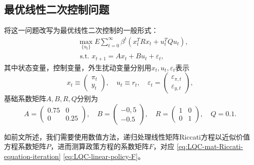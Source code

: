 \subsection{最优线性二次控制问题}
将这一问题改写为最优线性二次控制的一般形式：
\begin{align*}
  \label{eq:LQC-example-LQ-form}
  &\max_{\{u_t\}} E \sum_{t=0}^{\infty} \beta^t \left(x_t^T R x_t + u_t^T Q u_t\right), \\
  &\text{ s.t. } x_{t+1} = A x_t + B u_t + \varepsilon_t,
\end{align*}
其中状态变量，控制变量，外生扰动变量分别用$x_t,u_t,\varepsilon_t$表示
\begin{equation*}
  x_t \equiv \begin{pmatrix}
    \pi_t \\
    y_t
  \end{pmatrix},\quad
  u_t \equiv r_t,\quad
  \varepsilon_t = \begin{pmatrix}
  \varepsilon_{\pi,t} \\
  \varepsilon_{y,t}
  \end{pmatrix},
\end{equation*}
基础系数矩阵$A,B,R,Q$分别为
\begin{equation*}
  A=\begin{pmatrix}
  0.75 & 0 \\
  0 & 0.25
  \end{pmatrix}, \quad
  B = \begin{pmatrix}
  -0,5 \\ -0.5
  \end{pmatrix}, \quad
  R = \begin{pmatrix}
  1 & 0 \\
  0 & 1
  \end{pmatrix}, \quad
  Q=0.1.
\end{equation*}

如前文所述，我们需要使用数值方法，递归处理线性矩阵Riccati方程以近似价值方程系数矩阵$P$，进而测算政策方程的系数矩阵$F$，对应  \eqref{eq:LQC-mat-Riccati-equation-iteration} \eqref{eq:LQC-linear-policy-F}。

